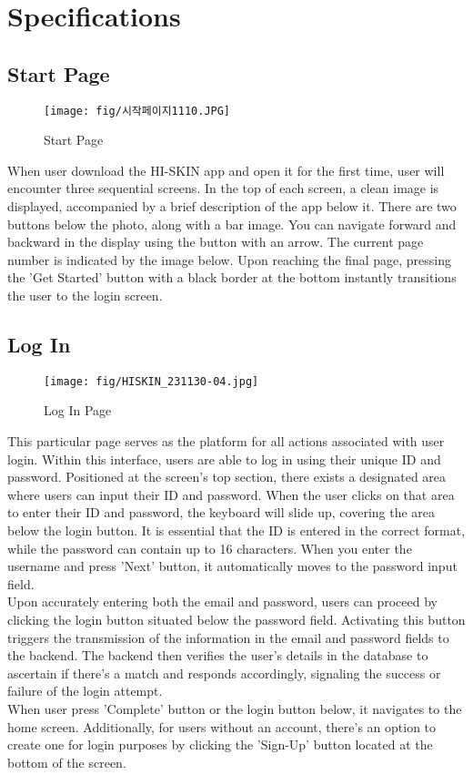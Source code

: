 \documentclass[conference]{IEEEtran}
\begin{document}
\section{Specifications}

\subsection{Start Page}
    \begin{figure}[h]
    \centering
    \texttt{[image: fig/시작페이지1110.JPG]}
    \label{fig:Start Page}
    \caption{Start Page} 
    \end{figure}
When user download the HI-SKIN app and open it for the first time, user will encounter three sequential screens. In the top of each screen, a clean image is displayed, accompanied by a brief description of the app below it. There are two buttons below the photo, along with a bar image. You can navigate forward and backward in the display using the button with an arrow. The current page number is indicated by the image below. Upon reaching the final page, pressing the 'Get Started' button with a black border at the bottom instantly transitions the user to the login screen.\\  

\subsection{Log In}
    \begin{figure}[h]
    \centering
    \texttt{[image: fig/HISKIN\_231130-04.jpg]}
    \label{fig:Log In Page}
    \caption{Log In Page} 
    \end{figure}
This particular page serves as the platform for all actions associated with user login. Within this interface, users are able to log in using their unique ID and password. Positioned at the screen's top section, there exists a designated area where users can input their ID and password. When the user clicks on that area to enter their ID and password, the keyboard will slide up, covering the area below the login button. It is essential that the ID is entered in the correct format, while the password can contain up to 16 characters. When you enter the username and press 'Next' button, it automatically moves to the password input field. \\  Upon accurately entering both the email and password, users can proceed by clicking the login button situated below the password field. Activating this button triggers the transmission of the information in the email and password fields to the backend. The backend then verifies the user's details in the database to ascertain if there's a match and responds accordingly, signaling the success or failure of the login attempt.\\ When user press 'Complete' button or the login button below, it navigates to the home screen. Additionally, for users without an account, there's an option to create one for login purposes by clicking the 'Sign-Up' button located at the bottom of the screen. \\ 
\end{document}
